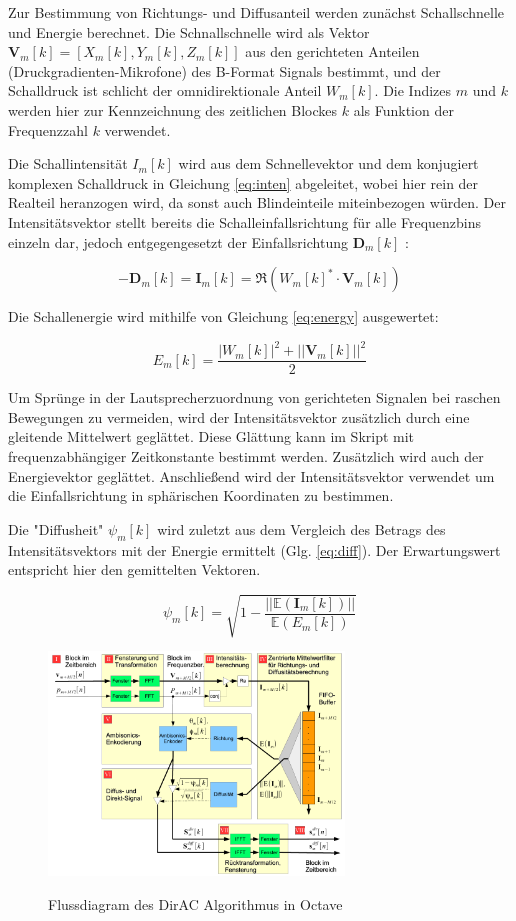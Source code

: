 Zur Bestimmung von Richtungs- und Diffusanteil werden zunächst Schallschnelle und Energie berechnet. Die Schnallschnelle wird als Vektor $\textbf{V}_{m}[k] = [X_{m}[k], Y_{m}[k], Z_{m}[k]]$ aus den gerichteten Anteilen (Druckgradienten-Mikrofone) des B-Format Signals bestimmt, und der Schalldruck ist schlicht der omnidirektionale Anteil $W_{m}[k]$. Die Indizes $m$ und $k$ werden hier zur Kennzeichnung des zeitlichen Blockes $k$ als Funktion der Frequenzzahl $k$ verwendet.

Die Schallintensität $I_{m}[k]$ wird aus dem Schnellevektor und dem konjugiert komplexen Schalldruck in Gleichung \ref{eq:inten} abgeleitet, wobei hier rein der Realteil heranzogen wird, da sonst auch Blindeinteile miteinbezogen würden. Der Intensitätsvektor stellt bereits die Schalleinfallsrichtung für alle Frequenzbins einzeln dar, jedoch entgegengesetzt der Einfallsrichtung $\textbf{D}_{m}[k]$ :

\begin{equation}
    -\textbf{D}_{m}[k] = \textbf{I}_{m}[k] = \Re(W_{m}[k]^{*} \cdot \textbf{V}_{m}[k])
    \label{eq:inten}
\end{equation}

Die Schallenergie wird mithilfe von Gleichung \ref{eq:energy} ausgewertet:

\begin{equation}
    E_{m}[k] = \frac{|W_{m}[k]|^2+||\textbf{V}_{m}[k]||^2}{2}
    \label{eq:energy}
\end{equation}

Um Sprünge in der Lautsprecherzuordnung von gerichteten Signalen bei raschen Bewegungen zu vermeiden, wird der Intensitätsvektor zusätzlich durch eine gleitende Mittelwert geglättet. Diese Glättung kann im Skript mit frequenzabhängiger Zeitkonstante bestimmt werden. Zusätzlich wird auch der Energievektor geglättet. Anschließend wird der Intensitätsvektor verwendet um die Einfallsrichtung in sphärischen Koordinaten zu bestimmen.

Die "Diffusheit" $\psi_{m}[k]$ wird zuletzt aus dem Vergleich des Betrags des Intensitätsvektors mit der Energie ermittelt (Glg. \ref{eq:diff}). Der Erwartungswert entspricht hier den gemittelten Vektoren.

\begin{equation}
    \psi_{m}[k] = \sqrt{1 - \frac{||\mathbb{E}(\textbf{I}_{m}[k])||}{\mathbb{E}(E_{m}[k])}}
    \label{eq:diff}
\end{equation}

\begin{figure}[!ht]
  \centering
  \includegraphics[width=0.7\textwidth]{implementierung/plots/flow.png}
  \label{fig:flow}
  \caption{Flussdiagram des DirAC Algorithmus in Octave}
\end{figure}
